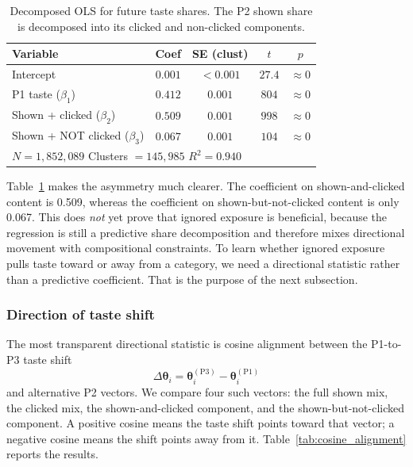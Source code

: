 \documentclass[11pt]{article}
\begin{document}
\begin{table}[ht]
\centering
\caption{Decomposed OLS for future taste shares. The P2 shown share is decomposed into its clicked and non-clicked components.}
\label{tab:decomposed_ols}
\begin{tabular}{lcccc}
\toprule
Variable & Coef & SE (clust) & $t$ & $p$ \\
\midrule
Intercept & $0.001$ & $<0.001$ & $27.4$ & $\approx 0$ \\
P1 taste ($\beta_1$) & $0.412$ & $0.001$ & $804$ & $\approx 0$ \\
Shown + clicked ($\beta_2$) & $\mathbf{0.509}$ & $0.001$ & $998$ & $\approx 0$ \\
Shown + NOT clicked ($\beta_3$) & $\mathbf{0.067}$ & $0.001$ & $104$ & $\approx 0$ \\
\midrule
\multicolumn{5}{l}{$N = 1{,}852{,}089$ \quad Clusters $= 145{,}985$ \quad $R^2 = 0.940$} \\
\bottomrule
\end{tabular}
\end{table}
\FloatBarrier

Table~\ref{tab:decomposed_ols} makes the asymmetry much clearer. The coefficient on shown-and-clicked content is 0.509, whereas the coefficient on shown-but-not-clicked content is only 0.067. This does \emph{not} yet prove that ignored exposure is beneficial, because the regression is still a predictive share decomposition and therefore mixes directional movement with compositional constraints. To learn whether ignored exposure pulls taste toward or away from a category, we need a directional statistic rather than a predictive coefficient. That is the purpose of the next subsection.

\subsubsection{Direction of taste shift}

The most transparent directional statistic is cosine alignment between the P1-to-P3 taste shift
\[
\Delta\boldsymbol{\theta}_i
=
\boldsymbol{\theta}_i^{(\mathrm{P3})}
-
\boldsymbol{\theta}_i^{(\mathrm{P1})}
\]
and alternative P2 vectors. We compare four such vectors: the full shown mix, the clicked mix, the shown-and-clicked component, and the shown-but-not-clicked component. A positive cosine means the taste shift points toward that vector; a negative cosine means the shift points away from it. Table~\ref{tab:cosine_alignment} reports the results.
\end{document}
